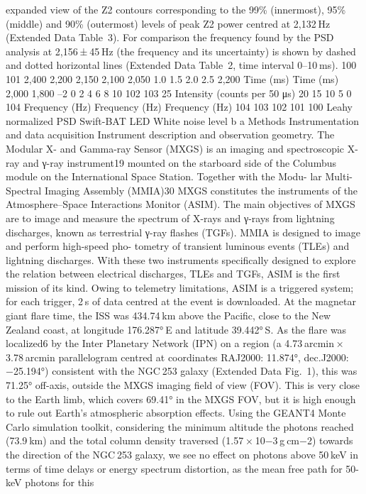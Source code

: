 expanded view of the Z2 contours corresponding to the 99\% (innermost),
95\% (middle) and 90\% (outermost) levels of peak Z2 power centred at 2,132 Hz
(Extended Data Table 3). For comparison the frequency found by the PSD analysis
at 2,156 ± 45 Hz (the frequency and its uncertainty) is shown by dashed and
dotted horizontal lines (Extended Data Table 2, time interval 0–10 ms).
100
101
2,400
2,200
2,150
2,100
2,050
1.0
1.5
2.0
2.5
2,200
Time (ms)
Time (ms)
2,000
1,800
–2
0
2
4
6
8
10
102
103
25
Intensity (counts per 50 μs)
20
15
10
5
0
104
Frequency (Hz)
Frequency (Hz)
Frequency (Hz)
104
103
102
101
100
Leahy normalized PSD
Swift-BAT
LED
White noise level
b
a
Methods
Instrumentation and data acquisition
Instrument description and observation geometry. The Modular X-
and Gamma-ray Sensor (MXGS) is an imaging and spectroscopic X-ray
and γ-ray instrument19 mounted on the starboard side of the Columbus
module on the International Space Station. Together with the Modu-
lar Multi-Spectral Imaging Assembly (MMIA)30 MXGS constitutes the
instruments of the Atmosphere–Space Interactions Monitor (ASIM).
The main objectives of MXGS are to image and measure the spectrum of
X-rays and γ-rays from lightning discharges, known as terrestrial γ-ray
flashes (TGFs). MMIA is designed to image and perform high-speed pho-
tometry of transient luminous events (TLEs) and lightning discharges.
With these two instruments specifically designed to explore the relation
between electrical discharges, TLEs and TGFs, ASIM is the first mission
of its kind. Owing to telemetry limitations, ASIM is a triggered system;
for each trigger, 2 s of data centred at the event is downloaded.
At the magnetar giant flare time, the ISS was 434.74 km above the
Pacific, close to the New Zealand coast, at longitude 176.287° E and
latitude 39.442° S. As the flare was localized6 by the Inter Planetary
Network (IPN) on a region (a 4.73 arcmin × 3.78 arcmin parallelogram
centred at coordinates RAJ2000: 11.874°, dec.J2000: −25.194°) consistent
with the NGC 253 galaxy (Extended Data Fig. 1), this was 71.25° off-axis,
outside the MXGS imaging field of view (FOV). This is very close to the
Earth limb, which covers 69.41° in the MXGS FOV, but it is high enough
to rule out Earth’s atmospheric absorption effects. Using the GEANT4
Monte Carlo simulation toolkit, considering the minimum altitude
the photons reached (73.9 km) and the total column density traversed
(1.57 × 10−3 g cm−2) towards the direction of the NGC 253 galaxy, we see
no effect on photons above 50 keV in terms of time delays or energy
spectrum distortion, as the mean free path for 50-keV photons for this
